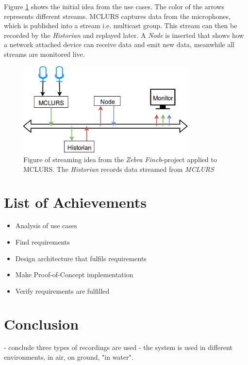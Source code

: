 Figure \ref{fig:streamingidea:idea} shows the initial idea from the use cases. The color of the arrows represents different streams. MCLURS captures data from the microphones, which is published into a stream i.e. multicast group. This stream can then be recorded by the \textit{Historian} and replayed later. A \textit{Node} is inserted that shows how a network attached device can receive data and emit new data, meanwhile all streams are monitored live.
\begin{figure}[H]
	\centering
	\includegraphics[width=0.8\textwidth]{figures/streaming_idea_all}
	\caption{Figure of streaming idea from the \textit{Zebra Finch}-project applied to MCLURS. The \textit{Historian} records data streamed from \textit{MCLURS}} \label{fig:streamingidea:idea}
\end{figure}

\section{List of Achievements}
\begin{itemize}
	\item Analysis of use cases
	\item Find requirements
	\item Design architecture that fulfils requirements
	\item Make Proof-of-Concept implementation
	\item Verify requirements are fulfilled
\end{itemize}

\section{Conclusion}
- conclude three types of recordings are used
- the system is used in different environments, in air, on ground, "in water".
